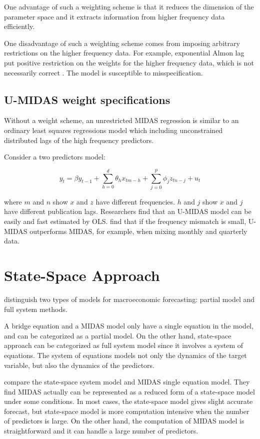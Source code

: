 One advantage of such a weighting scheme is that it reduces the dimension of the parameter space and it  extracts information from higher frequency data efficiently. 

One disadvantage of such a weighting scheme comes from imposing arbitrary restrictions on the higher frequency data. For example, exponential Almon lag put positive restriction on the weights for the higher frequency data, which is not necessarily correct \cite{Foroni2013}. The model is susceptible to misspecification. 



\subsection{U-MIDAS weight specifications}

Without a weight scheme, an unrestricted MIDAS regression is similar to an ordinary least squares regressions model which including unconstrained distributed lags of the high frequency predictors.

Consider a two predictors model:

$${y_t= \beta y_{t-1} + \sum_{h=0}^d\theta_{h}x_{tm-h}+\sum_{j=0}^p\phi_{j}z_{tn-j}+u_t}$$

where $m$ and $n$ show $x$ and $z$ have different frequencies.  $h$ and $j$ show $x$ and $j$ have different publication lags. Researchers find that an U-MIDAS model can be easily and fast estimated by OLS.  find that if the frequency mismatch is small, U-MIDAS outperforms MIDAS, for example, when mixing monthly and quarterly data. 


\section{State-Space Approach}  

 distinguish two types of models for macroeconomic forecasting: partial model and full system methods. 

A bridge equation and a MIDAS model only have a single equation in the model, and can be categorized as a partial model. On the other hand, state-space approach can be categorized as full system model since it involves a system of equations. The system of equations models not only the dynamics of the target variable, but also the dynamics of the predictors. 

 compare the state-space system model and  MIDAS single equation model. They find MIDAS actually can be represented as a reduced form of a state-space model under some conditions. In most cases, the state-space model gives slight accurate forecast, but state-space model is more computation intensive when the number of predictors is large.  On the other hand, the computation of MIDAS model is straightforward and it can handle a large number of predictors.  


